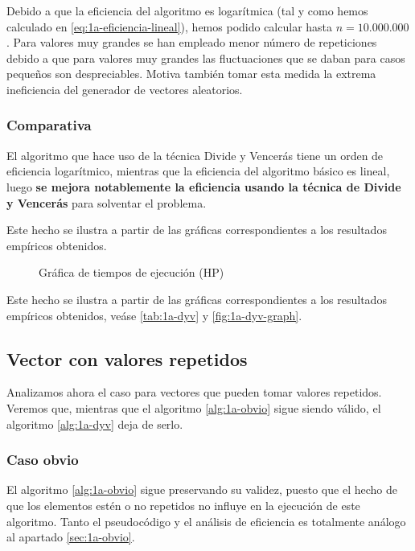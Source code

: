 Debido a que la eficiencia del algoritmo es logarítmica (tal y como hemos calculado en \ref{eq:1a-eficiencia-lineal}),
hemos podido calcular hasta $n = 10.000.000$. Para valores muy grandes se han empleado menor número de repeticiones
debido a que para valores muy grandes las fluctuaciones que se daban para casos pequeños son despreciables. 
Motiva también tomar esta medida la extrema ineficiencia del generador de vectores aleatorios. 

\subsubsection{Comparativa}

El algoritmo que hace uso de la técnica Divide y Vencerás tiene un orden de eficiencia logarítmico, mientras
que la eficiencia del algoritmo básico es lineal, luego \textbf{se mejora notablemente la eficiencia usando la técnica de 
Divide y Vencerás} para solventar el problema. 

Este hecho se ilustra a partir de las gráficas correspondientes a los resultados empíricos obtenidos.   

\begin{figure}[H]
    \centering
    \caption{Gráfica de tiempos de ejecución (HP)}
\end{figure}

Este hecho se ilustra a partir de las gráficas correspondientes a los resultados empíricos obtenidos, veáse 
\ref{tab:1a-dyv} y \ref{fig:1a-dyv-graph}.

\subsection{Vector con valores repetidos}

Analizamos ahora el caso para vectores que pueden tomar valores repetidos. Veremos que, mientras que el algoritmo
\ref{alg:1a-obvio} sigue siendo válido, el algoritmo \ref{alg:1a-dyv} deja de serlo. 

\subsubsection{Caso obvio}

El algoritmo \ref{alg:1a-obvio} sigue preservando su validez, puesto que el hecho de que los elementos estén o no
repetidos no influye en la ejecución de este algoritmo. Tanto el pseudocódigo y el análisis de eficiencia es totalmente
análogo al apartado \ref{sec:1a-obvio}. 

